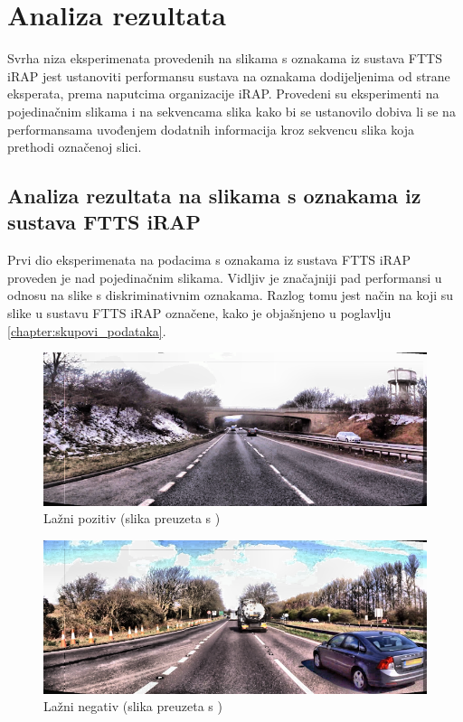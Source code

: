 \documentclass[times, utf8, diplomski, numeric]{fer}
\begin{document}
\section{Analiza rezultata}
Svrha niza eksperimenata provedenih na slikama s oznakama iz sustava FTTS iRAP jest ustanoviti performansu sustava na oznakama dodijeljenima od strane eksperata, prema naputcima organizacije iRAP.
Provedeni su eksperimenti na pojedinačnim slikama i na sekvencama slika kako bi se ustanovilo dobiva li se na performansama uvođenjem dodatnih informacija kroz sekvencu slika koja prethodi označenoj slici.

\subsection{Analiza rezultata na slikama s oznakama iz sustava FTTS iRAP}
Prvi dio eksperimenata na podacima s oznakama iz sustava FTTS iRAP proveden je nad pojedinačnim slikama. 
Vidljiv je značajniji pad performansi u odnosu na slike s diskriminativnim oznakama. 
Razlog tomu jest način na koji su slike u sustavu FTTS iRAP označene, kako je objašnjeno u poglavlju \ref{chapter:skupovi_podataka}.

\begin{figure}[H]
\centering
\includegraphics[scale=0.55]{images/single_irap_false_positive.png}
\caption{Lažni pozitiv (slika preuzeta s \citep{url:ftts_irap})}
\label{img:single_irap_false_positive}
\end{figure}

\begin{figure}[H]
\centering
\includegraphics[scale=0.55]{images/single_irap_false_negative.png}
\caption{Lažni negativ (slika preuzeta s \citep{url:ftts_irap})}
\label{img:single_irap_false_negative}
\end{figure}
\end{document}
